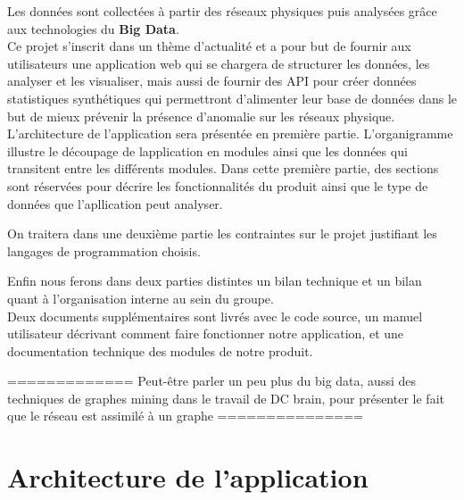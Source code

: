 		Les données sont collectées à partir des réseaux physiques puis analysées grâce aux technologies du \textbf{Big Data}.\\
		
		Ce projet s'inscrit dans un thème d'actualité et a pour but de fournir aux utilisateurs une application web qui se chargera de structurer les données, les analyser et les visualiser, mais aussi de fournir des API pour créer données statistiques synthétiques qui permettront d'alimenter leur base de données dans le but de mieux prévenir la présence d'anomalie sur les réseaux physique.\\
		
		L'architecture de l'application sera présentée en première partie. L'organigramme illustre le découpage de lapplication en modules ainsi que les données qui transitent entre les différents modules. Dans cette première partie, des sections sont réservées pour décrire les fonctionnalités du produit ainsi que le type de données que l'apllication peut analyser.
		
		On traitera dans une deuxième partie les contraintes sur le projet justifiant les langages de programmation choisis.
		
		Enfin nous ferons dans deux parties distintes un bilan technique et un bilan quant à l'organisation interne au sein du groupe.\\
		
		Deux documents supplémentaires sont livrés avec le code source, un manuel utilisateur décrivant comment faire fonctionner notre application, et une documentation technique des modules de notre produit.
		
		
		
		
		============= Peut-être parler un peu plus du big data, aussi des techniques de graphes mining dans le travail de DC brain, pour présenter le fait que le réseau est assimilé à un graphe ===============
	
	\section{Architecture de l'application}
